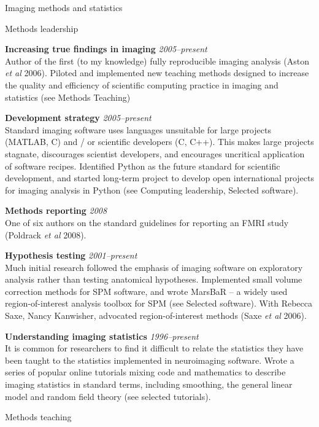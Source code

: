 \documentclass{cv}
\newcommand{\PlaceDateNote}[3]{{\bf #1} \hfill {\em #2} \\#3}
\begin{document}
\begin{cvSection}{Imaging methods and statistics}

\begin{cvSubSection}{Methods leadership}

\PlaceDateNote{Increasing true findings in imaging}{2005--present}
{Author of the first (to my knowledge) fully reproducible imaging analysis
(Aston {\em et al} 2006).  Piloted and implemented new teaching methods
designed to increase the quality and efficiency of scientific computing
practice in imaging and statistics (see Methods Teaching)}

\PlaceDateNote{Development strategy}{2005--present}
{Standard imaging software uses languages unsuitable for large projects
    (MATLAB, C) and / or scientific developers (C, C++).  This makes large
    projects stagnate, discourages scientist developers, and encourages
    uncritical application of software recipes.  Identified Python as the
future standard for scientific development, and started long-term project to
develop open international projects for imaging analysis in Python (see
Computing leadership, Selected software).  }

\PlaceDateNote{Methods reporting}{2008}
{One of six authors on the standard guidelines for reporting an FMRI study
(Poldrack {\em et al} 2008).}

\PlaceDateNote{Hypothesis testing}{2001--present}
{Much initial research followed the emphasis of imaging software on
    exploratory analysis rather than testing anatomical hypotheses.
    Implemented small volume correction methods for SPM software, and wrote
    MarsBaR -- a widely used region-of-interest analysis toolbox for SPM (see
Selected software).  With Rebecca Saxe, Nancy Kanwisher, advocated
region-of-interest methods (Saxe {\em et al} 2006).}

\PlaceDateNote{Understanding imaging statistics}{1996--present}
{It is common for researchers to find it difficult to relate the statistics
    they have been taught to the statistics implemented in neuroimaging
    software.  Wrote a series of popular online tutorials mixing code and
mathematics to describe imaging statistics in standard terms, including
smoothing, the general linear model and random field theory (see selected
tutorials).}

\end{cvSubSection}

\begin{cvSubSection}{Methods teaching}


\end{cvSubSection}
\end{cvSection}
\end{document}
